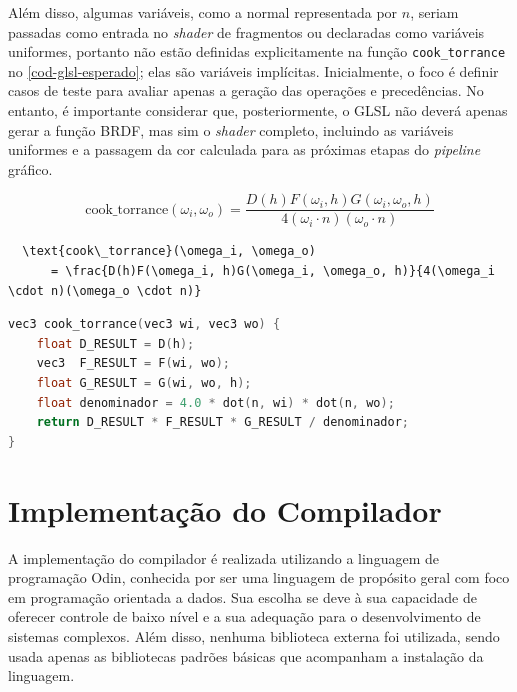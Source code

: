 \documentclass[english, 
               brazil, 
               bsc] %
               {dcomp-abntex2}
\begin{document}
Além disso, algumas variáveis, como a normal representada por \( n \), seriam passadas como entrada no \textit{shader} de fragmentos ou declaradas como variáveis uniformes, portanto não estão definidas explicitamente na função \texttt{cook\_torrance} no \autoref{cod-glsl-esperado}; elas são variáveis implícitas. Inicialmente, o foco é definir casos de teste para avaliar apenas a geração das operações e precedências. No entanto, é importante considerar que, posteriormente, o GLSL não deverá apenas gerar a função BRDF, mas sim o \textit{shader} completo, incluindo as variáveis uniformes e a passagem da cor calculada para as próximas etapas do \textit{pipeline} gráfico.



\begin{equation} \label{eq-cook-torrance}
  \text{cook\_torrance}(\omega_i, \omega_o) = \frac{D(h)F(\omega_i, h)G(\omega_i, \omega_o, h)}{4(\omega_i \cdot n)(\omega_o \cdot n)}
\end{equation}


\begin{codigo}[H]
\caption{\small Entrada em \LaTeX\  (Cook-Torrance BRDF).}
\label{cod-input-latex}
\begin{lstlisting}
  \text{cook\_torrance}(\omega_i, \omega_o) 
      = \frac{D(h)F(\omega_i, h)G(\omega_i, \omega_o, h)}{4(\omega_i \cdot n)(\omega_o \cdot n)}
\end{lstlisting}
\end{codigo}


\begin{codigo}[H]
\caption{\small Saída em GLSL esperada (Cook-Torrance BRDF).}
\label{cod-glsl-esperado}
\begin{lstlisting}[language=C]
vec3 cook_torrance(vec3 wi, vec3 wo) {
    float D_RESULT = D(h);
    vec3  F_RESULT = F(wi, wo);
    float G_RESULT = G(wi, wo, h); 
    float denominador = 4.0 * dot(n, wi) * dot(n, wo);
    return D_RESULT * F_RESULT * G_RESULT / denominador;
}
\end{lstlisting}
\end{codigo}


\section{Implementação do Compilador} \label{compiladorimplementacao}


A implementação do compilador é realizada utilizando a linguagem de programação Odin, conhecida por ser uma linguagem de propósito geral com foco em programação orientada a dados. Sua escolha se deve à sua capacidade de oferecer controle de baixo nível e a sua adequação para o desenvolvimento de sistemas complexos. Além disso, nenhuma biblioteca externa foi utilizada, sendo usada apenas as bibliotecas padrões básicas que acompanham a instalação da linguagem.
\end{document}
